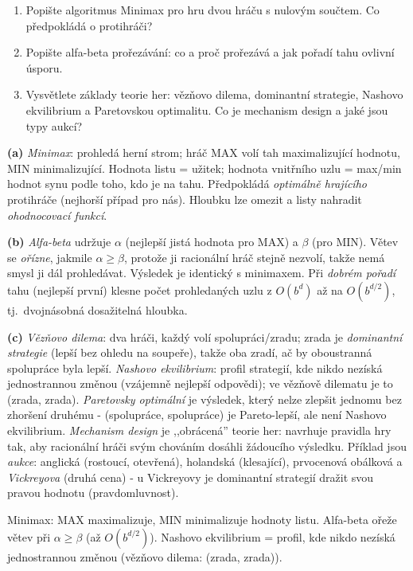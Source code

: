 \begin{zadani}
\begin{enumerate}[label=(\alph*)]
  \item {} Popište algoritmus Minimax pro hru dvou hráču s nulovým součtem. Co předpokládá o protihráči?
  \item {} Popište alfa-beta prořezávání: co a proč prořezává a jak pořadí tahu ovlivní úsporu.
  \item {} Vysvětlete základy teorie her: vězňovo dilema, dominantní strategie, Nashovo ekvilibrium a Paretovskou optimalitu. Co je mechanism design a jaké jsou typy aukcí?
\end{enumerate}
\end{zadani}

\begin{reseni}
\textbf{(a)} \emph{Minimax}: prohledá herní strom; hráč MAX volí tah maximalizující hodnotu, MIN minimalizující. Hodnota listu = užitek; hodnota vnitřního uzlu = max/min hodnot synu podle toho, kdo je na tahu. Předpokládá \emph{optimálně hrajícího} protihráče (nejhorší případ pro nás). Hloubku lze omezit a listy nahradit \emph{ohodnocovací funkcí}.

\textbf{(b)} \emph{Alfa-beta} udržuje $\alpha$ (nejlepší jistá hodnota pro MAX) a $\beta$ (pro MIN). Větev se \emph{ořízne}, jakmile $\alpha\ge\beta$, protože ji racionální hráč stejně nezvolí, takže nemá smysl ji dál prohledávat. Výsledek je identický s minimaxem. Při \emph{dobrém pořadí} tahu (nejlepší první) klesne počet prohledaných uzlu z $O(b^d)$ až na $O(b^{d/2})$, tj.\ dvojnásobná dosažitelná hloubka.

\textbf{(c)} \emph{Vězňovo dilema}: dva hráči, každý volí spolupráci/zradu; zrada je \emph{dominantní strategie} (lepší bez ohledu na soupeře), takže oba zradí, ač by oboustranná spolupráce byla lepší. \emph{Nashovo ekvilibrium}: profil strategií, kde nikdo nezíská jednostrannou změnou (vzájemně nejlepší odpovědi); ve vězňově dilematu je to (zrada, zrada). \emph{Paretovsky optimální} je výsledek, který nelze zlepšit jednomu bez zhoršení druhému - (spolupráce, spolupráce) je Pareto-lepší, ale není Nashovo ekvilibrium. \emph{Mechanism design} je ,,obrácená'' teorie her: navrhuje pravidla hry tak, aby racionální hráči svým chováním dosáhli žádoucího výsledku. Příklad jsou \emph{aukce}: anglická (rostoucí, otevřená), holandská (klesající), prvocenová obálková a \emph{Vickreyova} (druhá cena) - u Vickreyovy je dominantní strategií dražit svou pravou hodnotu (pravdomluvnost).
\end{reseni}

\begin{jadro}
Minimax: MAX maximalizuje, MIN minimalizuje hodnoty listu. Alfa-beta ořeže větev při $\alpha\ge\beta$ (až $O(b^{d/2})$). Nashovo ekvilibrium = profil, kde nikdo nezíská jednostrannou změnou (vězňovo dilema: (zrada, zrada)).
\end{jadro}

